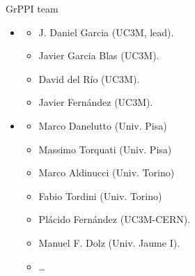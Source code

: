 \begin{frame}[t]{GrPPI team}
\begin{itemize}
  \item {}
  \begin{itemize}
    \item J. Daniel Garcia (UC3M, lead).
    \item Javier Garcia Blas (UC3M).
    \item David del Río (UC3M).
    \item Javier Fernández (UC3M).
  \end{itemize}
  \vfill
  \item {}
  \begin{itemize}
    \item Marco Danelutto (Univ. Pisa)
    \item Massimo Torquati (Univ. Pisa)
    \item Marco Aldinucci (Univ. Torino)
    \item Fabio Tordini (Univ. Torino)
    \item Plácido Fernández (UC3M-CERN).
    \item Manuel F. Dolz (Univ. Jaume I).
    \item \ldots
  \end{itemize}
\end{itemize}
\end{frame}
